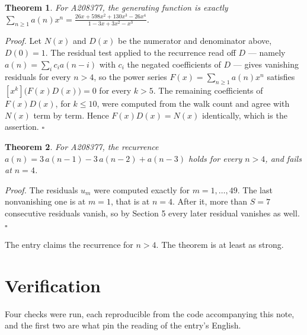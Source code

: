 \documentclass[11pt]{article}
\newtheorem{theorem}{Theorem}
\theoremstyle{definition}
\begin{document}
\begin{theorem} For A208377, the generating function is exactly $\sum_{n\ge 1} a(n)x^n = \frac{26x + 598x^{2} + 130x^{3} - 26x^{4}}{1 - 3x + 3x^{2} - x^{3}}$.\end{theorem}

{\itshape Proof.} Let $N(x)$ and $D(x)$ be the numerator and denominator above, $D(0)=1$. The residual test applied to the recurrence read off $D$ --- namely $a(n) = \sum_i c_i a(n-i)$ with $c_i$ the negated coefficients of $D$ --- gives vanishing residuals for every $n > 4$, so the power series $F(x)=\sum_{n\ge 1}a(n)x^n$ satisfies $[x^k]\bigl(F(x)D(x)\bigr) = 0$ for every $k > 5$. The remaining coefficients of $F(x)D(x)$, for $k \le 10$, were computed from the walk count and agree with $N(x)$ term by term. Hence $F(x)D(x) = N(x)$ identically, which is the assertion. $\square$

\begin{theorem} For A208377, the recurrence $a(n) = 3\,a(n-1) - 3\,a(n-2) + a(n-3)$ holds for every $n > 4$, and fails at $n = 4$.\end{theorem}

{\itshape Proof.} The residuals $u_m$ were computed exactly for $m = 1,\dots,49$. The last nonvanishing one is at $m = 1$, that is at $n = 4$. After it, more than $S = 7$ consecutive residuals vanish, so by Section 5 every later residual vanishes as well. $\square$

The entry claims the recurrence for $n > 4$. The theorem is at least as strong.

\section{Verification}

Four checks were run, each reproducible from the code accompanying this note, and the first two are what pin the reading of the entry's English.
\end{document}
